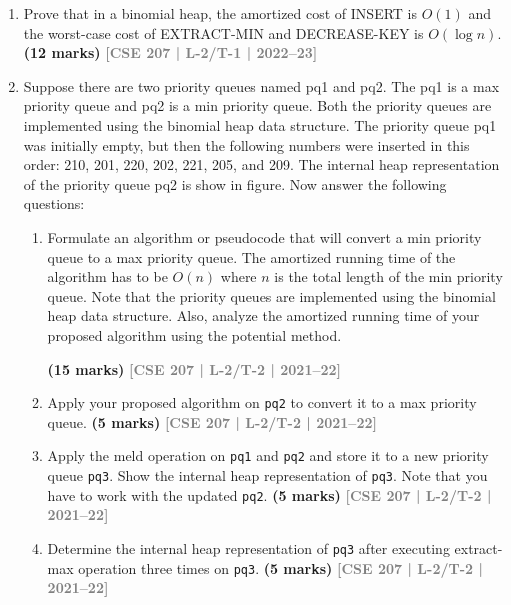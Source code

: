 \documentclass[12pt]{article}
\newcommand{\yr}[1]{\hfill\textcolor{gray}{\small\textbf{[#1]}}}
\newcommand{\mk}[1]{\textcolor{orange!70!black}{\small\textbf{(#1 marks)}}}
\begin{document}
\begin{enumerate}
\item Prove that in a binomial heap, the amortized cost of INSERT is $O(1)$ and the worst-case cost of EXTRACT-MIN and DECREASE-KEY is $O(\log n)$.
\mk{12} \yr{CSE 207 | L-2/T-1 | 2022--23}


\item Suppose there are two priority queues named pq1 and pq2. The pq1 is a max priority queue and pq2 is a min priority queue. Both the priority queues are implemented using the binomial heap data structure. The priority queue pq1 was initially empty, but then the following numbers were inserted in this order: 210, 201, 220, 202, 221, 205, and 209. The internal heap representation of the priority queue pq2 is show in figure. Now answer the following questions:

\vspace{0.5cm}

\begin{center}
\FigHpPqMax
\end{center}
\begin{enumerate}
\item Formulate an algorithm or pseudocode that will convert a min priority queue to a max priority queue. The amortized running time of the algorithm has to be $O(n)$ where $n$ is the total length of the min priority queue. Note that the priority queues are implemented using the binomial heap data structure. Also, analyze the amortized running time of your proposed algorithm using the potential method.

\mk{15} \yr{CSE 207 | L-2/T-2 | 2021--22}

\item Apply your proposed algorithm on \texttt{pq2} to convert it to a max priority queue.
\mk{5} \yr{CSE 207 | L-2/T-2 | 2021--22}

\item Apply the meld operation on \texttt{pq1} and \texttt{pq2} and store it to a new priority queue \texttt{pq3}. Show the internal heap representation of \texttt{pq3}. Note that you have to work with the updated \texttt{pq2}.
\mk{5} \yr{CSE 207 | L-2/T-2 | 2021--22}

\item Determine the internal heap representation of \texttt{pq3} after executing extract-max operation three times on \texttt{pq3}.
\mk{5} \yr{CSE 207 | L-2/T-2 | 2021--22}


\end{enumerate}
\end{enumerate}
\end{document}
